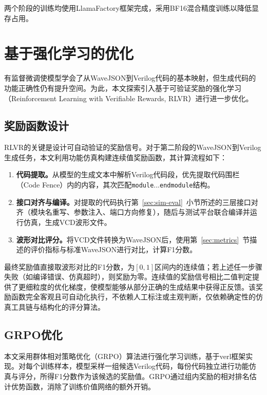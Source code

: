 两个阶段的训练均使用LlamaFactory框架完成，采用BF16混合精度训练以降低显存占用。


\section{基于强化学习的优化}

有监督微调使模型学会了从WaveJSON到Verilog代码的基本映射，但生成代码的功能正确性仍有提升空间。为此，本文探索引入基于可验证奖励的强化学习（Reinforcement Learning with Verifiable Rewards, RLVR）进行进一步优化。

\subsection{奖励函数设计}

RLVR的关键是设计可自动验证的奖励信号。对于第二阶段的WaveJSON到Verilog生成任务，本文利用功能仿真构建连续值奖励函数，其计算流程如下：

\begin{enumerate}
  \item \textbf{代码提取。}从模型的生成文本中解析Verilog代码段，优先提取代码围栏（Code Fence）内的内容，其次匹配\texttt{module}...\texttt{endmodule}结构。
  \item \textbf{接口对齐与编译。}对提取的代码执行第~\ref{sec:sim-eval}~小节所述的三层接口对齐（模块名重写、参数注入、端口方向修复），随后与测试平台联合编译并运行仿真，生成VCD波形文件。
  \item \textbf{波形对比评分。}将VCD文件转换为WaveJSON后，使用第~\ref{sec:metrics}~节描述的评价指标与标准WaveJSON进行对比，计算F1分数。
\end{enumerate}

最终奖励值直接取波形对比的F1分数，为$[0, 1]$区间内的连续值；若上述任一步骤失败（如编译错误、仿真超时），则奖励为零。连续值的奖励信号相比二值判定提供了更细粒度的优化梯度，使模型能够从部分正确的生成结果中获得正反馈。该奖励函数完全客观且可自动化执行，不依赖人工标注或主观判断，仅依赖确定性的仿真工具链与结构化的评分算法。

\subsection{GRPO优化}

本文采用群体相对策略优化（GRPO）算法进行强化学习训练，基于verl框架实现。对每个训练样本，模型采样一组候选Verilog代码，每份代码独立进行功能仿真与评分，所得F1分数作为该候选的奖励值。GRPO通过组内奖励的相对排名估计优势函数，消除了训练价值网络的额外开销。

